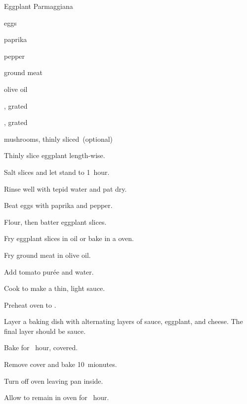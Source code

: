\begin{recipe}{Eggplant Parmaggiana}{}{}

\begin{ingredients}
\item {}
\item eggs
\item paprika
\item pepper
\item ground meat
\item olive oil
\item {}
\item {}, grated
\item {}, grated
\item mushrooms, thinly sliced~(optional)
\end{ingredients}

\begin{directions}
\item Thinly slice eggplant length-wise.
\item Salt slices and let stand \half{} to 1~hour.
\item Rinse well with tepid water and pat dry.
\item Beat eggs with paprika and pepper.
\item Flour, then batter eggplant slices.
\item Fry eggplant slices in oil or bake in a  oven.
\item Fry ground meat in olive oil.
\item Add tomato purée and water.
\item Cook to make a thin, light sauce.
\item Preheat oven to .
\item Layer a baking dish with alternating layers of sauce, eggplant, and cheese. The final layer should be sauce.
\item Bake for \half~hour, covered.
\item Remove cover and bake 10~mionutes.
\item Turn off oven leaving pan inside.
\item Allow to remain in oven for \half~hour.
\end{directions}

\end{recipe}
